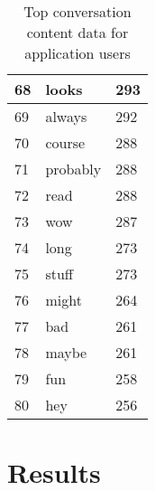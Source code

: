 \begin{table}[!htbp]
\begin{minipage}[b]{.5\textwidth}
\begin{tabular}{|l|l|l|}
		68 & looks & 293 \\ \hline
		69 & always & 292 \\ \hline
		70 & course & 288 \\ \hline
		71 & probably & 288 \\ \hline
		72 & read & 288 \\ \hline
		73 & wow & 287 \\ \hline
		74 & long & 273 \\ \hline
		75 & stuff & 273 \\ \hline
		76 & might & 264 \\ \hline
		77 & bad & 261 \\ \hline
		78 & maybe & 261 \\ \hline
		79 & fun & 258 \\ \hline
		80 & hey & 256 \\ \hline
	\end{tabular}
\end{minipage}
	\caption{Top conversation content data for application users}
	\label{tab:revpol}
\end{table}


\section{Results}
\label{sec:AFconc}

